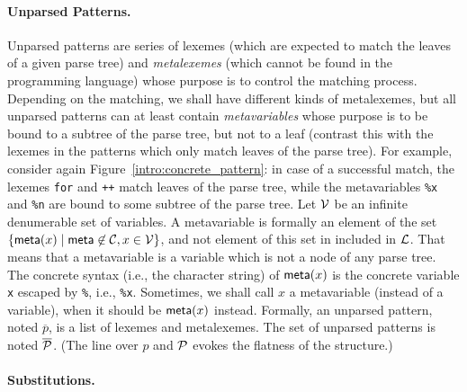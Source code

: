 \paragraph{Unparsed Patterns.}

Unparsed patterns are series of lexemes (which are expected to match
the leaves of a given parse tree) and \emph{meta\-lexemes} (which
cannot be found in the programming language) whose purpose is to
control the matching process. Depending on the matching, we shall have
different kinds of meta\-lexemes, but all unparsed patterns can at
least contain \emph{meta\-variables} whose purpose is to be bound to a
subtree of the parse tree, but not to a leaf (contrast this with the
lexemes in the patterns which only match leaves of the parse
tree). For example, consider again
Figure~\ref{intro:concrete_pattern}: in case of a successful match,
the lexemes \texttt{for} and \texttt{++} match leaves of the parse
tree, while the meta\-variables \texttt{\%x} and \texttt{\%n} are
bound to some subtree of the parse tree. Let \({\cal V}\) be an
infinite denumerable set of variables. A meta\-variable is formally an
element of the set \(\{\textsf{meta}(x) \mid \textsf{meta} \not\in {\cal C}, x
\in {\cal V}\}\), and not element of this set in included in \({\cal
  L}\). That means that a meta\-variable is a variable which is not a
node of any parse tree. The concrete syntax (i.e., the character
string) of \(\textsf{meta}(x)\) is the concrete variable \texttt{x} escaped by
\texttt{\%}, i.e., \texttt{\%x}. Sometimes, we shall call \(x\) a
meta\-variable (instead of a variable), when it should be \(\textsf{meta}(x)\)
instead. Formally, an unparsed pattern, noted \(\overline{p}\), is a
list of lexemes and meta\-lexemes. The set of unparsed patterns is
noted \(\overline{\cal P}\). (The line over \(p\) and \(\cal P\)
evokes the flatness of the structure.)

\paragraph{Substitutions.}

